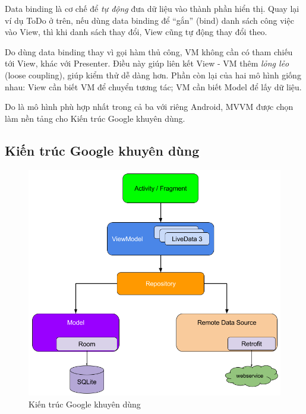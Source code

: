 \documentclass[../../thesis]{subfiles}
\begin{document}
Data binding là cơ chế để \emph{tự động} đưa dữ liệu vào thành phần hiển thị.
Quay lại ví dụ ToDo ở trên, nếu dùng data binding để ``gắn'' (bind) danh sách
công việc vào View, thì khi danh sách thay đổi, View cũng tự động thay đổi theo.

Do dùng data binding thay vì gọi hàm thủ công, VM không cần có tham chiếu tới
View, khác với Presenter. Điều này giúp liên kết View - VM thêm \emph{lỏng lẻo}
(loose coupling), giúp kiểm thử dễ dàng hơn. Phần còn lại của hai mô hình giống
nhau: View cần biết VM để chuyển tương tác; VM cần biết Model để lấy dữ liệu.

Do là mô hình phù hợp nhất trong cả ba với riêng Android, MVVM được chọn làm nền
tảng cho Kiến trúc Google khuyên dùng.

\subsection{Kiến trúc Google khuyên dùng}\label{sec:app-arch}

\begin{figure}
    \centering
    \vspace*{-6mm}
    \includegraphics[width=\linewidth]{../images/final-architecture.png}
    \vspace*{-10mm}
    \caption{Kiến trúc Google khuyên dùng \cite{GOOGL_APP_ARCH}}
    \label{fig:google-recom-arch}
\end{figure}
\end{document}
